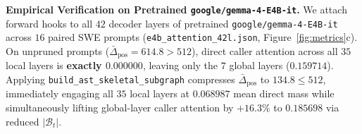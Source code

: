 \documentclass[10pt,twocolumn,letterpaper]{article}
\begin{document}
\noindent\textbf{Empirical Verification on Pretrained \texttt{google/gemma-4-E4B-it}.}
We attach forward hooks to all $42$ decoder layers of pretrained \texttt{google/gemma-4-E4B-it} across $16$ paired SWE prompts (\texttt{e4b\_attention\_42l.json}, Figure~\ref{fig:metrics}c). On unpruned prompts ($\bar{\Delta}_{\text{pos}}{=}614.8 > 512$), direct caller attention across all $35$ local layers is \textbf{exactly $0.000000$}, leaving only the $7$ global layers ($0.159714$). Applying \texttt{build\_ast\_skeletal\_subgraph} compresses $\bar{\Delta}_{\text{pos}}$ to $134.8 \le 512$, immediately engaging all $35$ local layers at \textbf{$0.068987$} mean direct mass while simultaneously lifting global-layer caller attention by \textbf{$+16.3\%$} to $0.185698$ via reduced $|\mathcal{B}_t|$.

\end{document}
